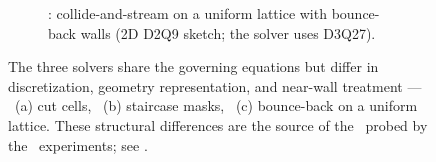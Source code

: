 \begin{figure}[tb]
\begin{subfigure}[b]{\linewidth}
{}
    \caption{\lbmmodel: collide-and-stream on a uniform lattice with bounce-back
      walls (2D D2Q9 sketch; the solver uses D3Q27).}
    \label{fig:solver:lbm}
  \end{subfigure}
  \caption{The three solvers share the governing equations but differ in
    discretization, geometry representation, and near-wall treatment ---
    \pyudales\ (a) cut cells, \pypalm\ (b) staircase masks, \lbmmodel\ (c)
    bounce-back on a uniform lattice. These structural differences are the
    source of the \discrepancy\ probed by the \crossmodel\ experiments; see
    .}
  \label{fig:solver_numerics}
\end{figure}
